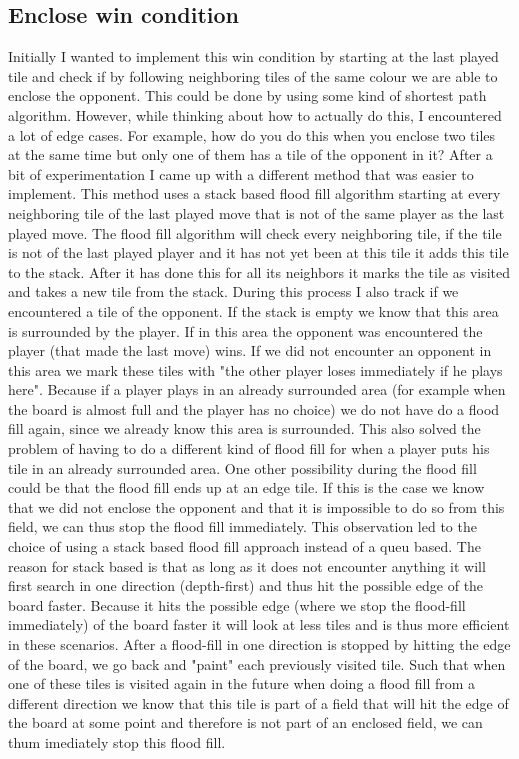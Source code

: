 \documentclass{article}
\begin{document}
\subsection{Enclose win condition}
Initially I wanted to implement this win condition by starting at the last played tile and check if by following neighboring tiles of the same colour we are able to enclose the opponent. This could be done by using some kind of shortest path algorithm. However, while thinking about how to actually do this, I encountered a lot of edge cases. For example, how do you do this when you enclose two tiles at the same time but only one of them has a tile of the opponent in it? After a bit of experimentation I came up with a different method that was easier to implement. This method uses a stack based flood fill algorithm starting at every neighboring tile of the last played move that is not of the same player as the last played move. The flood fill algorithm will check every neighboring tile, if the tile is not of the last played player and it has not yet been at this tile it adds this tile to the stack. After it has done this for all its neighbors it marks the tile as visited and takes a new tile from the stack. During this process I also track if we encountered a tile of the opponent. If the stack is empty we know that this area is surrounded by the player. If in this area the opponent was encountered the player (that made the last move) wins. If we did not encounter an opponent in this area we mark these tiles with "the other player loses immediately if he plays here". Because if a player plays in an already surrounded area (for example when the board is almost full and the player has no choice) we do not have do a flood fill again, since we already know this area is surrounded. This also solved the problem of having to do a different kind of flood fill for when a player puts his tile in an already surrounded area.
One other possibility during the flood fill could be that the flood fill ends up at an edge tile. If this is the case we know that we did not enclose the opponent and that it is impossible to do so from this field, we can thus stop the flood fill immediately. This observation led to the choice of using a stack based flood fill approach instead of a queu based. The reason for stack based is that as long as it does not encounter anything it will first search in one direction (depth-first) and thus hit the possible edge of the board faster. Because it hits the possible edge (where we stop the flood-fill immediately) of the board faster it will look at less tiles and is thus more efficient in these scenarios.  
After a flood-fill in one direction is stopped by hitting the edge of the board, we go back and "paint" each previously visited tile. Such that when one of these tiles is visited again in the future when doing a flood fill from a different direction we know that this tile is part of a field that will hit the edge of the board at some point and therefore is not part of an enclosed field, we can thum imediately stop this flood fill.
\end{document}
